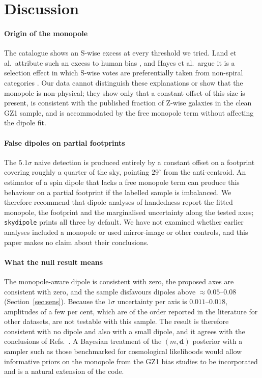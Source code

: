 \documentclass[preprint,12pt]{elsarticle}
\begin{document}
\section{Discussion}
\label{sec:discussion}

\paragraph{Origin of the monopole}
The catalogue shows an S-wise excess at every threshold we tried.
Land et al.\ attribute such an excess to human bias \cite{Land2008}, and Hayes et al.\ argue it is a selection effect in which S-wise votes are preferentially taken from non-spiral categories \cite{Hayes2017}.
Our data cannot distinguish these explanations or show that the monopole is non-physical; they show only that a constant offset of this size is present, is consistent with the published fraction of Z-wise galaxies in the clean GZ1 sample, and is accommodated by the free monopole term without affecting the dipole fit.

\paragraph{False dipoles on partial footprints}
The $5.1\sigma$ naive detection is produced entirely by a constant offset on a footprint covering roughly a quarter of the sky, pointing $29^\circ$ from the anti-centroid.
An estimator of a spin dipole that lacks a free monopole term can produce this behaviour on a partial footprint if the labelled sample is imbalanced.
We therefore recommend that dipole analyses of handedness report the fitted monopole, the footprint and the marginalised uncertainty along the tested axes; \texttt{skydipole} prints all three by default.
We have not examined whether earlier analyses \cite{Longo2011,Shamir2012,Shamir2016,Shamir2020,Shamir2022} included a monopole or used mirror-image or other controls, and this paper makes no claim about their conclusions.

\paragraph{What the null result means}
The monopole-aware dipole is consistent with zero, the proposed axes are consistent with zero, and the sample disfavours dipoles above $\approx0.05$--$0.08$ (Section~\ref{sec:sens}).
Because the $1\sigma$ uncertainty per axis is $0.011$--$0.018$, amplitudes of a few per cent, which are of the order reported in the literature for other datasets, are not testable with this sample.
The result is therefore consistent with no dipole and also with a small dipole, and it agrees with the conclusions of Refs.~\cite{Land2008,Iye2021,PatelDesmond2024}.
A Bayesian treatment of the $(m,\mathbf d)$ posterior with a sampler such as those benchmarked for cosmological likelihoods \cite{Caldwell2009,Albert2025} would allow informative priors on the monopole from the GZ1 bias studies to be incorporated and is a natural extension of the code.
\end{document}
